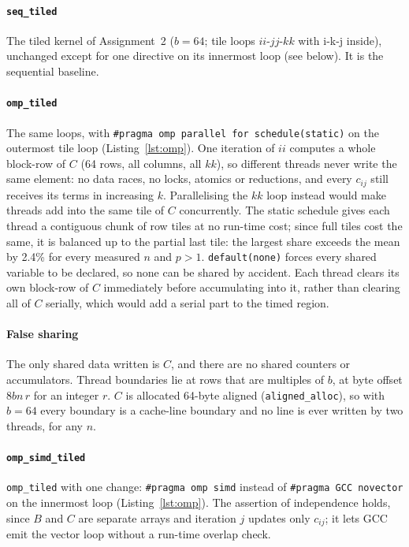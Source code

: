\documentclass[conference,a4paper]{IEEEtran}
\newcommand{\code}[1]{\texttt{#1}}
\newcommand{\seqk}{\code{seq\_tiled}}
\newcommand{\ompk}{\code{omp\_tiled}}
\newcommand{\simdk}{\code{omp\_simd\_tiled}}
\begin{document}
\paragraph{\seqk} The tiled kernel of Assignment~2 ($b = 64$; tile loops
$ii$-$jj$-$kk$ with i-k-j inside), unchanged except for one directive on its
innermost loop (see below). It is the sequential baseline.

\paragraph{\ompk} The same loops, with
\code{\#pragma omp parallel for schedule(static)} on the outermost tile loop
(Listing~\ref{lst:omp}). One iteration of $ii$ computes a whole block-row of
$C$ (64 rows, all columns, all $kk$), so different threads never write the
same element: no data races, no locks, atomics or reductions, and every
$c_{ij}$ still receives its terms in increasing $k$. Parallelising the $kk$
loop instead would make threads add into the same tile of $C$ concurrently.
The static schedule gives each thread a contiguous chunk of row tiles at no
run-time cost; since full tiles cost the same, it is balanced up to the
partial last tile: the largest share exceeds the mean by 2.4\% for every
measured $n$ and $p > 1$. \code{default(none)} forces every shared variable to
be declared, so none can be shared by accident. Each thread clears its own
block-row of $C$ immediately before accumulating into it, rather than clearing
all of $C$ serially, which would add a serial part to the timed region.

\paragraph{False sharing} The only shared data written is $C$, and there are
no shared counters or accumulators. Thread boundaries lie at rows that are
multiples of $b$, at byte offset $8bn\,r$ for an integer $r$. $C$ is allocated
64-byte aligned (\code{aligned\_alloc}), so with $b = 64$ every boundary is a
cache-line boundary and no line is ever written by two threads, for any $n$.

\paragraph{\simdk} \ompk{} with one change: \code{\#pragma omp simd} instead
of \code{\#pragma GCC novector} on the innermost loop (Listing~\ref{lst:omp}).
The assertion of independence holds, since $B$ and $C$ are separate arrays and
iteration $j$ updates only $c_{ij}$; it lets GCC emit the vector loop without
a run-time overlap check.
\end{document}
